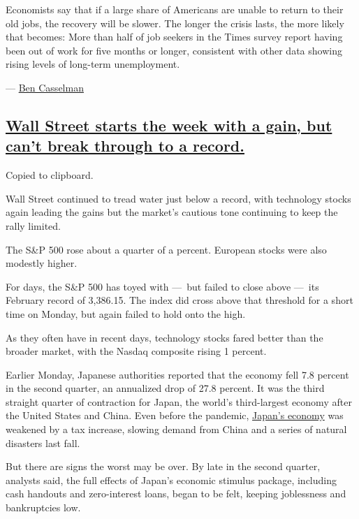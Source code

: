 Economists say that if a large share of Americans are unable to return
to their old jobs, the recovery will be slower. The longer the crisis
lasts, the more likely that becomes: More than half of job seekers in
the Times survey report having been out of work for five months or
longer, consistent with other data showing rising levels of long-term
unemployment.

--- \href{https://www.nytimes3xbfgragh.onion/by/ben-casselman}{Ben
Casselman}

\hypertarget{wall-street-starts-the-week-with-a-gain-but-cant-break-through-to-a-record}{%
\subsection{\texorpdfstring{\protect\hyperlink{wall-street-starts-the-week-with-a-gain-but-cant-break-through-to-a-record}{Wall
Street starts the week with a gain, but can't break through to a
record.}}{Wall Street starts the week with a gain, but can't break through to a record.}}\label{wall-street-starts-the-week-with-a-gain-but-cant-break-through-to-a-record}}

Copied to clipboard.

Wall Street continued to tread water just below a record, with
technology stocks again leading the gains but the market's cautious tone
continuing to keep the rally limited.

The S\&P 500 rose about a quarter of a percent. European stocks were
also modestly higher.

For days, the S\&P 500 has toyed with ---~but failed to close above
---~its February record of 3,386.15. The index did cross above that
threshold for a short time on Monday, but again failed to hold onto the
high.

As they often have in recent days, technology stocks fared better than
the broader market, with the Nasdaq composite rising 1 percent.

Earlier Monday, Japanese authorities reported that the economy fell 7.8
percent in the second quarter, an annualized drop of 27.8 percent. It
was the third straight quarter of contraction for Japan, the world's
third-largest economy after the United States and China. Even before the
pandemic,
\href{https://www.nytimes3xbfgragh.onion/2020/06/20/business/japan-unemployment.html}{Japan's
economy} was weakened by a tax increase, slowing demand from China and a
series of natural disasters last fall.

But there are signs the worst may be over. By late in the second
quarter, analysts said, the full effects of Japan's economic stimulus
package, including cash handouts and zero-interest loans, began to be
felt, keeping joblessness and bankruptcies low.

